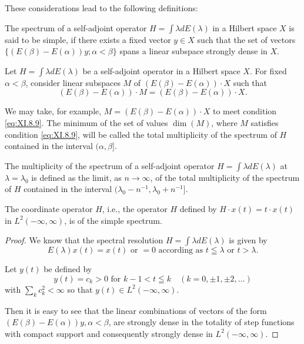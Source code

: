These considerations lead to the following definitions: 

\begin{definition}\label{def:XI.8.Definition.1} The spectrum of a self-adjoint operator $H = \int \lambda dE(\lambda)$ in a Hilbert space $X$ is said to be simple, if there exists a fixed vector $y \in X$ such that the set of vectors $\{(E(\beta) - E(\alpha))y; \alpha < \beta\}$ spans a linear subspace strongly dense in $X$. 
\end{definition}

\begin{definition}\label{def:XI.8.Definition.2} Let $H = \int \lambda dE(\lambda)$ be a self-adjoint operator in a Hilbert space $X$. For fixed $\alpha < \beta$, consider linear subspaces $M$ of $(E(\beta) - E(\alpha)) \cdot X$ such that 
\begin{equation}\label{eq:XI.8.9}
(E (\beta) - E (\alpha)) \cdot M = (E (\beta) - E (\alpha)) \cdot X.
\end{equation}
\end{definition}

We may take, for example, $M = (E(\beta) - E(\alpha)) \cdot X$ to meet condition \eqref{eq:XI.8.9}. The minimum of the set of values $\dim(M)$, where $M$ satisfies condition \eqref{eq:XI.8.9}, will be called the total multiplicity of the spectrum of $H$ contained in the interval $(\alpha, \beta]$. 

\begin{definition}\label{def:XI.8.Definition.3} The multiplicity of the spectrum of a self-adjoint operator $H = \int \lambda dE(\lambda)$ at $\lambda = \lambda_0$ is defined as the limit, as $n \to \infty$, of the total multiplicity of the spectrum of $H$ contained in the interval $(\lambda_0 - n^{-1}, \lambda_0 + n^{-1}]$. 
\end{definition}

\begin{examplen} The coordinate operator $H$, i.e., the operator $H$ defined by $H \cdot x(t) = t \cdot x(t)$ in $L^2(-\infty, \infty)$, is of the simple spectrum.

\end{examplen}
\begin{proof}
 We know that the spectral resolution $H = \int \lambda dE(\lambda)$ is given by 
\[
E (\lambda) x (t) = x (t) \text{ or } = 0 \text{ according as } t \leqq \lambda \text{ or } t > \lambda . \]

Let $y(t)$ be defined by 
\[
y (t) = c _{k} > 0 \text{ for } k - 1 < t \leqq k \quad (k = 0, \pm 1, \pm 2, \dots)
\]
with $\sum\limits_{k} c_k^2 < \infty$ so that $y(t) \in L^2(-\infty, \infty)$. 

Then it is easy to see that the linear combinations of vectors of the form $(E(\beta)-E(\alpha))y,\alpha<\beta$, are strongly dense in the totality of step functions with compact support and consequently strongly dense in $L^{2}(-\infty,\infty)$. 
\end{proof}

